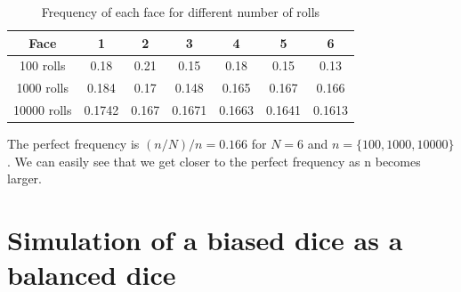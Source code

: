 \documentclass[a4paper]{article}
\begin{document}
\begin{table}[H]
\begin{center}
\begin{tabular}{|c|c|c|c|c|c|c|}
\hline
Face                   & 1      & 2     & 3      & 4      & 5      & 6      \\ \hline
100 rolls   & 0.18   & 0.21  & 0.15   & 0.18   & 0.15   & 0.13   \\ \hline
1000 rolls  & 0.184  & 0.17  & 0.148  & 0.165  & 0.167  & 0.166  \\ \hline
10000 rolls & 0.1742 & 0.167 & 0.1671 & 0.1663 & 0.1641 & 0.1613 \\ \hline
\end{tabular}
\caption*{\label{BD} Frequency of each face for different number of rolls}
\end{center}
\end{table}
The perfect frequency is $(n/N)/n = 0.166$ for $N = 6$ and $n = \{100, 1000, 10000\}$. We can easily see that we get closer to the perfect frequency as n becomes larger.\\

\newpage
\section*{Simulation of a biased dice as a balanced dice}
\end{document}
